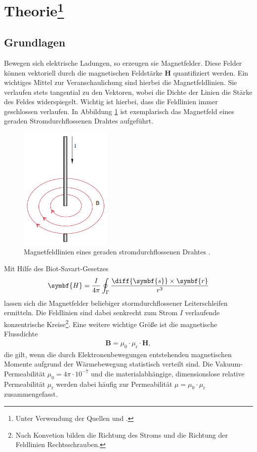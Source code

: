 \section[Theorie]{Theorie\footnote{Unter Verwendung der Quellen \cite[]{man:v308} und \cite[]{demtroeder2}.}}

\subsection{Grundlagen}
Bewegen sich elektrische Ladungen, so erzeugen sie Magnetfelder.
Diese Felder können vektoriell durch die magnetischen Feldstärke $\symbf{H}$ quantifiziert werden.
Ein wichtiges Mittel zur Veranschaulichung sind hierbei die Magnetfeldlinien.
Sie verlaufen stets tangential zu den Vektoren, wobei die Dichte der Linien die Stärke des Feldes widerspiegelt.
Wichtig ist hierbei, dass die Feldlinien immer geschlossen verlaufen.
In Abbildung \ref{fig:ger_stromdurchfl_draht} ist exemplarisch das Magnetfeld eines geraden Stromdurchflossenen Drahtes aufgeführt.
\begin{figure}[H]
    \centering
    \includegraphics*[height = 6cm]{./abbildungen/stromdurchfl_gerader_draht.png}
    \caption[]{Magnetfeldlinien eines geraden stromdurchflossenen Drahtes \cite[S. 86]{demtroeder2}.}
    \label{fig:ger_stromdurchfl_draht}
\end{figure}
%
\noindent
Mit Hilfe des Biot-Savart-Gesetzes 
\begin{align}
    \label{eq:biot_savart}
    \symbf{H} = \frac{I}{4 \pi} \oint_\Gamma \frac{\diff{\symbf{s}} \times \symbf{r}}{r^3}
\end{align}
lassen sich die Magnetfelder beliebiger stormdurchflossener Leiterschleifen \Gamma ermitteln.
Die Feldlinien sind dabei senkrecht zum Strom $I$ verlaufende konzentrische Kreise\footnote{Nach Konvetion
bilden die Richtung des Stroms und die Richtung der Feldlinien Rechtsschrauben.}.
\noindent
Eine weitere wichtige Größe ist die magnetische Flussdichte
\begin{align}
    \label{eq:B_mu_H}
    \symbf{B} = \mu_0 \cdot \mu_\text{r} \cdot \symbf{H},
\end{align}
die gilt, wenn die durch Elektronenbewegungen entstehenden magnetischen Momente aufgrund der 
Wärmebewegung statistisch verteilt sind.
Die Vakuum-Permeabilität $\mu_0 = 4 \pi \cdot 10^{-7}$ und die materialabhängige, dimensionslose relative Permeabilität $\mu_\text{r}$
werden dabei häufig zur Permeabilität $\mu = \mu_0 \cdot \mu_\text{r}$ zusammengefasst.

